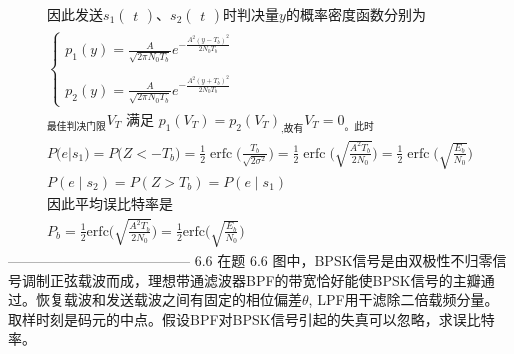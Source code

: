 \documentclass[utf8]{article}
\begin{document}
$$\begin{gathered}
\text{因此发送}s_1\begin{pmatrix}t\end{pmatrix}\text{、}s_2\begin{pmatrix}t\end{pmatrix}\text{时判决量}y\text{的概率密度函数分别为} \\
\begin{cases}p_1\left(y\right)=\frac{A}{\sqrt{2\pi N_0T_b}}e^{-\frac{A^2\left(y-T_b\right)^2}{2N_0T_b}}\\\\p_2\left(y\right)=\frac{A}{\sqrt{2\pi N_0T_b}}e^{-\frac{A^2\left(y+T_b\right)^2}{2N_0T_b}}\end{cases} \\
_\text{最佳判决门限}V_T\text{ 满足 }p_1\left(V_T\right)=p_2\left(V_T\right)_\text{,故有}V_T=0_\text{。此时} \\
P\big(e | s_1\big)=P\big(Z<-T_b\big)=\frac{1}{2}\operatorname{erfc}\bigg(\frac{T_b}{\sqrt{2\sigma^2}}\bigg)=\frac{1}{2}\operatorname{erfc}\bigg(\sqrt{\frac{A^2T_b}{2N_0}}\bigg)=\frac{1}{2}\operatorname{erfc}\bigg(\sqrt{\frac{E_b}{N_0}}\bigg) \\
P\left(e\mid s_{2}\right)=P\left(Z>T_{b}\right)=P\left(e\mid s_{1}\right) \\
因此平均误比特率是 \\
P_{b}=\frac{1}{2}\mathrm{erfc}\Bigg(\sqrt{\frac{A^{2}T_{b}}{2N_{0}}}\Bigg)=\frac{1}{2}\mathrm{erfc}\Bigg(\sqrt{\frac{E_{b}}{N_{0}}}\Bigg) 
\end{gathered}$$
---------------------------------------
6.6 在题 6.6 图中，BPSK信号是由双极性不归零信号调制正弦载波而成，理想带通滤波器BPF的带宽恰好能使BPSK信号的主瓣通过。恢复载波和发送载波之间有固定的相位偏差$\theta$, LPF用干滤除二倍载频分量。取样时刻是码元的中点。假设BPF对BPSK信号引起的失真可以忽略，求误比特率。
\end{document}

